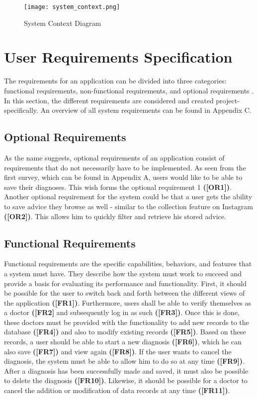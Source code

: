\begin{figure}[H]
	\centering
	\texttt{[image: system\_context.png]}
	\caption[System Context Diagram ]{System Context Diagram}
\end{figure}

\section{User Requirements Specification}
The requirements for an application can be divided into three categories: functional requirements, non-functional requirements, and optional requirements \cite[p. 51 ff.]{.req2} \cite{.req}. In this section, the different requirements are considered and created project-specifically. An overview of all system requirements can be found in Appendix C.

\subsection{Optional Requirements}
As the name suggests, optional requirements of an application consist of requirements that do not necessarily have to be implemented. As seen from the first survey, which can be found in Appendix A, users would like to be able to save their diagnoses. This wish forms the optional requirement 1  \textbf{([OR1])}. Another optional requirement for the system could be that a user gets the ability to save advice they browse as well - similar to the collection feature on Instagram \textbf{([OR2])}. This allows him to quickly filter and retrieve his stored advice.

\subsection{Functional Requirements}
Functional requirements are the specific capabilities, behaviors, and features that a system must have. They describe how the system must work to succeed and provide a basis for evaluating its performance and functionality. First, it should be possible for the user to switch back and forth between the different views of the application \textbf{([FR1])}. Furthermore, users shall be able to verify themselves as a doctor \textbf{([FR2]} and subsequently log in as such \textbf{([FR3])}. Once this is done, these doctors must be provided with the functionality to add new records to the database \textbf{([FR4])} and also to modify existing records \textbf{([FR5])}. Based on these records, a user should be able to start a new diagnosis \textbf{([FR6])}, which he can also save \textbf{([FR7])} and view again \textbf{([FR8])}. If the user wants to cancel the diagnosis, the system must be able to allow him to do so at any time \textbf{([FR9])}. After a diagnosis has been successfully made and saved, it must also be possible to delete the diagnosis \textbf{([FR10])}. Likewise, it should be possible for a doctor to cancel the addition or modification of data records at any time \textbf{([FR11])}. 



